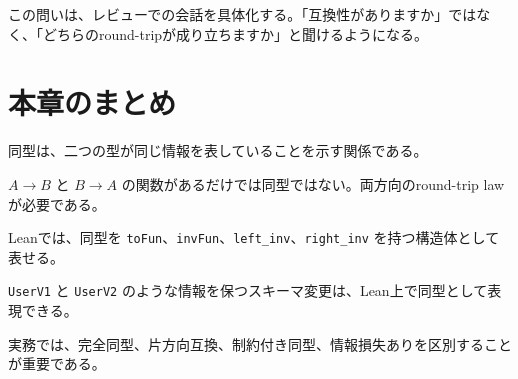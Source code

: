 この問いは、レビューでの会話を具体化する。「互換性がありますか」ではなく、「どちらのround-tripが成り立ちますか」と聞けるようになる。

\section{本章のまとめ}
\label{sec:ch06-summary}

同型は、二つの型が同じ情報を表していることを示す関係である。

$A \to B$ と $B \to A$ の関数があるだけでは同型ではない。両方向のround-trip lawが必要である。

Leanでは、同型を \texttt{toFun}、\texttt{invFun}、\texttt{left\_inv}、\texttt{right\_inv} を持つ構造体として表せる。

\texttt{UserV1} と \texttt{UserV2} のような情報を保つスキーマ変更は、Lean上で同型として表現できる。

実務では、完全同型、片方向互換、制約付き同型、情報損失ありを区別することが重要である。

